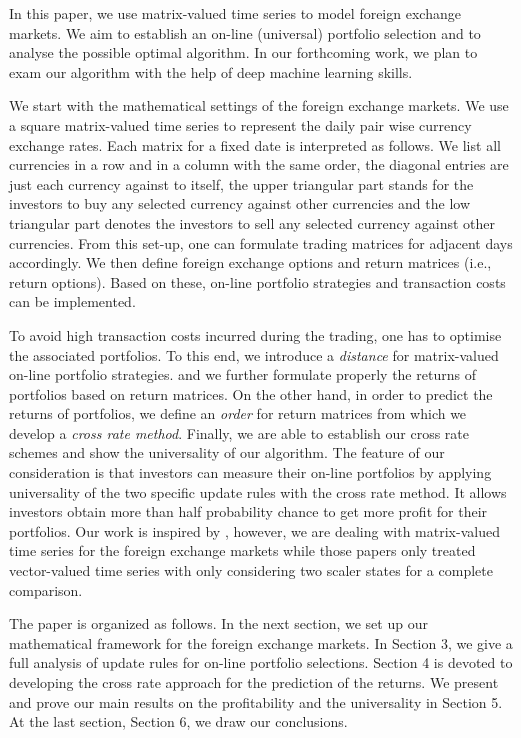 \documentclass[11pt]{article}
\numberwithin{equation}{section}
\begin{document}
In this paper, we use matrix-valued time series to model foreign exchange markets. We aim to establish an on-line  (universal) portfolio selection and to 
analyse the possible optimal algorithm. In our forthcoming work, we plan to exam our algorithm with the help of deep machine learning skills.      

We start with the mathematical settings of the foreign exchange markets.  We use a square matrix-valued time series to represent the daily pair 
wise currency exchange rates. Each matrix for a fixed date is interpreted as follows. We list all currencies in a row and in a column with the same order,  the 
diagonal entries are just each currency against to itself, the upper triangular part stands for the investors to buy any selected currency against other currencies  
and the low triangular part denotes the investors to sell any selected currency against other currencies.  From this set-up, one can formulate trading matrices 
for adjacent days accordingly. We then define foreign exchange options and return matrices (i.e., return options).  Based on these, on-line portfolio strategies  
and transaction costs can be  implemented. 

To avoid high transaction costs incurred during the trading, one has to optimise the associated portfolios. To this end, we introduce a {\it distance} for 
matrix-valued on-line portfolio strategies. and we further formulate properly the returns of portfolios based on return matrices. On the other hand, in order 
to predict the returns of portfolios, we define an {\it order} for return matrices from which we develop a {\it cross rate method}. Finally, we are able to establish 
our cross rate schemes and show the universality of our algorithm. The feature of our consideration is that investors can measure their on-line portfolios by 
applying universality of the two specific update rules with the cross rate method. It allows investors obtain more than half probability chance to get more profit 
for their portfolios. Our work is inspired by \cite{Davis,helmbold,ALZ2001}, however, we are dealing with matrix-valued time series for the foreign exchange markets 
while those papers only treated vector-valued time series with only considering two scaler states for a complete comparison.    

The paper is organized as follows. In the next section, we set up our mathematical framework for the foreign exchange markets. In Section 3, we give a 
full analysis of update rules for on-line portfolio selections. Section 4 is devoted to developing the cross rate approach for the prediction of the returns. 
We present and prove our main results on the profitability and the universality in Section 5. At the last section,  Section 6, we draw our conclusions.        
\end{document}
